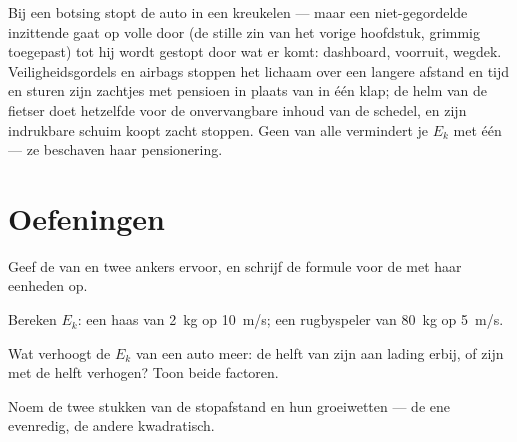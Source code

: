 \begin{remark}\label{rem:g9:kinetic-energy-safety:belts}
Bij een botsing stopt de auto in een  kreukelen --- maar
een niet-gegordelde inzittende gaat op volle  door (de
stille zin van het vorige hoofdstuk, grimmig toegepast) tot hij wordt
gestopt door wat er komt: dashboard, voorruit, wegdek. Veiligheidsgordels
en airbags stoppen het lichaam over een langere afstand en tijd en
sturen zijn  zachtjes met pensioen in plaats
van in één klap; de helm van de fietser doet hetzelfde voor de
onvervangbare inhoud van de schedel, en zijn indrukbare schuim koopt
 zacht stoppen. Geen van alle vermindert je $E_k$ met
één  --- ze beschaven haar pensionering.
\end{remark}

\section{Oefeningen}

\begin{exercise}[$\star$]\label{exo:g9:kinetic-energy-safety:1}
Geef de  van  en twee ankers ervoor,
en schrijf de formule voor de  met haar
eenheden op.
\end{exercise}

\begin{exercise}[$\star$]\label{exo:g9:kinetic-energy-safety:2}
Bereken $E_k$: een haas van \qty{2}{kg} op \qty{10}{m/s}; een
rugbyspeler van \qty{80}{kg} op \qty{5}{m/s}.
\end{exercise}

\begin{exercise}[$\star$]\label{exo:g9:kinetic-energy-safety:3}
Wat verhoogt de $E_k$ van een auto meer: de helft van zijn
 aan lading erbij, of zijn  met de helft
verhogen? Toon beide factoren.
\end{exercise}

\begin{exercise}[$\star$]\label{exo:g9:kinetic-energy-safety:4}
Noem de twee stukken van de stopafstand en hun groeiwetten --- de ene
evenredig, de andere kwadratisch.
\end{exercise}

